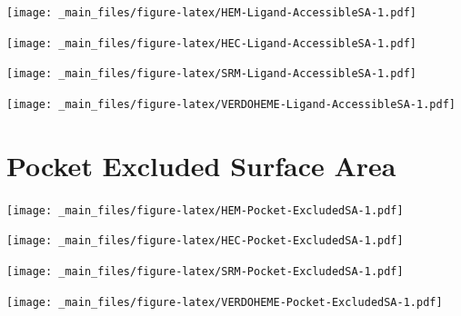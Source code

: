 \documentclass[a4paper, nobind]{templates/ociamthesis}
\let\origfigure\figure
\let\endorigfigure\endfigure
\renewenvironment{figure}[1][2] {
    \expandafter\origfigure\expandafter[H]
} {
    \endorigfigure
}
\begin{document}
\begin{figure}
\centering
\texttt{[image: \_main\_files/figure-latex/HEM-Ligand-AccessibleSA-1.pdf]}
\caption{\label{fig:HEM-Ligand-AccessibleSA}HEM: Ligand Accessible Surface Area}
\end{figure}

\begin{figure}
\centering
\texttt{[image: \_main\_files/figure-latex/HEC-Ligand-AccessibleSA-1.pdf]}
\caption{\label{fig:HEC-Ligand-AccessibleSA}HEC: Ligand Accessible Surface Area}
\end{figure}

\begin{figure}
\centering
\texttt{[image: \_main\_files/figure-latex/SRM-Ligand-AccessibleSA-1.pdf]}
\caption{\label{fig:SRM-Ligand-AccessibleSA}SRM: Ligand Accessible Surface Area}
\end{figure}

\begin{figure}
\centering
\texttt{[image: \_main\_files/figure-latex/VERDOHEME-Ligand-AccessibleSA-1.pdf]}
\caption{\label{fig:VERDOHEME-Ligand-AccessibleSA}VERDOHEME: Ligand Accessible Surface Area}
\end{figure}

\hypertarget{figs-pocketExcSA}{%
\section{Pocket Excluded Surface Area}\label{figs-pocketExcSA}}

\begin{figure}
\centering
\texttt{[image: \_main\_files/figure-latex/HEM-Pocket-ExcludedSA-1.pdf]}
\caption{\label{fig:HEM-Pocket-ExcludedSA}HEM: Pocket Excluded Surface Area}
\end{figure}

\begin{figure}
\centering
\texttt{[image: \_main\_files/figure-latex/HEC-Pocket-ExcludedSA-1.pdf]}
\caption{\label{fig:HEC-Pocket-ExcludedSA}HEC: Pocket Excluded Surface Area}
\end{figure}

\begin{figure}
\centering
\texttt{[image: \_main\_files/figure-latex/SRM-Pocket-ExcludedSA-1.pdf]}
\caption{\label{fig:SRM-Pocket-ExcludedSA}SRM: Pocket Excluded Surface Area}
\end{figure}

\begin{figure}
\centering
\texttt{[image: \_main\_files/figure-latex/VERDOHEME-Pocket-ExcludedSA-1.pdf]}
\caption{\label{fig:VERDOHEME-Pocket-ExcludedSA}VERDOHEME: Pocket Excluded Surface Area}
\end{figure}
\end{document}
